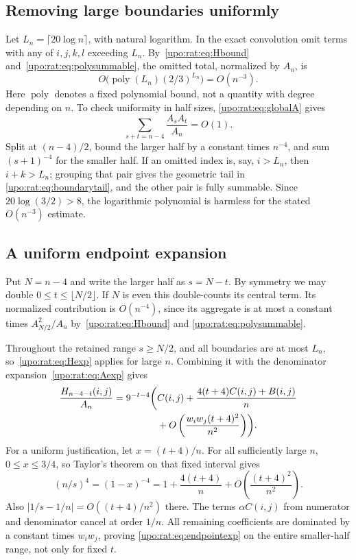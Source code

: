 \documentclass[11pt,letterpaper]{article}
\theoremstyle{remark}\newtheorem{remark}[theorem]{Remark}
\numberwithin{equation}{section}
\begin{document}
\subsection{Removing large boundaries uniformly}
Let $L_n=\lceil20\log n\rceil$, with natural logarithm. In the exact
convolution omit terms with any of $i,j,k,l$ exceeding $L_n$.
By~\eqref{upo:rat:eq:Hbound} and~\eqref{upo:rat:eq:polysummable}, the omitted total,
normalized by $A_n$, is
\begin{equation}\label{upo:rat:eq:boundarytail}
O\bigl(\operatorname{poly}(L_n)(2/3)^{L_n}\bigr)=O(n^{-3}).
\end{equation}
Here $\operatorname{poly}$ denotes a fixed polynomial bound, not a
quantity with degree depending on $n$. To check uniformity in half sizes,
\eqref{upo:rat:eq:globalA} gives
\begin{equation}\label{upo:rat:eq:convolnorm}
\sum_{s+t=n-4}\frac{A_sA_t}{A_n}=O(1).
\end{equation}
Split at $(n-4)/2$, bound the larger half by a constant times $n^{-4}$,
and sum $(s+1)^{-4}$ for the smaller half. If an omitted index is, say,
$i>L_n$, then $i+k>L_n$; grouping that pair gives the geometric tail in
\eqref{upo:rat:eq:boundarytail}, and the other pair is fully summable.
Since $20\log(3/2)>8$, the logarithmic polynomial is harmless for the
stated $O(n^{-3})$ estimate.

\subsection{A uniform endpoint expansion}
Put $N=n-4$ and write the larger half as $s=N-t$.
By symmetry we may double $0\le t\le\lfloor N/2\rfloor$.
If $N$ is even this double-counts its central term. Its normalized
contribution is $O(n^{-4})$, since its aggregate is at most a constant
times $A_{N/2}^2/A_n$ by~\eqref{upo:rat:eq:Hbound} and
\eqref{upo:rat:eq:polysummable}.

Throughout the retained range $s\ge N/2$, and all boundaries are at
most $L_n$, so~\eqref{upo:rat:eq:Hexp} applies for large $n$.
Combining it with the denominator expansion~\eqref{upo:rat:eq:Aexp} gives
\begin{align}\label{upo:rat:eq:endpointexp}
\frac{H_{n-4-t}(i,j)}{A_n}
=9^{-t-4}\biggl(&C(i,j)
+\frac{4(t+4)C(i,j)+B(i,j)}n\notag\\
&+O\left(\frac{w_iw_j(t+4)^2}{n^2}\right)\biggr).
\end{align}
For a uniform justification, let $x=(t+4)/n$.
For all sufficiently large $n$, $0\le x\le3/4$, so Taylor's theorem
on that fixed interval gives
\[
(n/s)^4=(1-x)^{-4}
=1+\frac{4(t+4)}n+O\left(\frac{(t+4)^2}{n^2}\right).
\]
Also $|1/s-1/n|=O((t+4)/n^2)$ there. The terms $\alpha C(i,j)$
from numerator and denominator cancel at order $1/n$. All remaining
coefficients are dominated by a constant times $w_iw_j$, proving
\eqref{upo:rat:eq:endpointexp} on the entire smaller-half range, not only for
fixed $t$.
\end{document}
